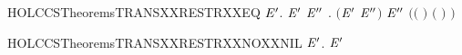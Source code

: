 \newcommand{\HOLCCSTheoremsTRANSXXRESTR}{\UseVerbatim{HOLCCSTheoremsTRANSXXRESTR}}
\begin{SaveVerbatim}{HOLCCSTheoremsTRANSXXRESTRXXEQ}
\HOLTokenTurnstile{} \HOLSymConst{\HOLTokenForall{}}   \ensuremath{\HOLBoundVar{E}\sp{\prime{}}}.
        \HOLTokenTransBegin{}\HOLTokenTransEnd \ensuremath{\HOLBoundVar{E}\sp{\prime{}}} \HOLSymConst{\HOLTokenEquiv{}}
     \HOLSymConst{\HOLTokenExists{}}\ensuremath{\HOLBoundVar{E}\sp{\prime{}\prime{}}} .
       \ensuremath{(}\ensuremath{\HOLBoundVar{E}\sp{\prime{}}} \HOLSymConst{\ensuremath{=}}   \ensuremath{\HOLBoundVar{E}\sp{\prime{}\prime{}}}\ensuremath{)} \HOLSymConst{\HOLTokenConj{}}  \HOLTokenTransBegin{}\HOLTokenTransEnd \ensuremath{\HOLBoundVar{E}\sp{\prime{}\prime{}}} \HOLSymConst{\HOLTokenConj{}}
       \ensuremath{(}\ensuremath{(} \HOLSymConst{\ensuremath{=}} \HOLConst{\ensuremath{\tau}}\ensuremath{)} \HOLSymConst{\HOLTokenDisj{}} \ensuremath{(} \HOLSymConst{\ensuremath{=}}  \ensuremath{)} \HOLSymConst{\HOLTokenConj{}}  \HOLConst{\HOLTokenNotIn{}}  \HOLSymConst{\HOLTokenConj{}}   \HOLConst{\HOLTokenNotIn{}} \ensuremath{)}
\end{SaveVerbatim}
\newcommand{\HOLCCSTheoremsTRANSXXRESTRXXEQ}{\UseVerbatim{HOLCCSTheoremsTRANSXXRESTRXXEQ}}
\begin{SaveVerbatim}{HOLCCSTheoremsTRANSXXRESTRXXNOXXNIL}
\HOLTokenTurnstile{} \HOLSymConst{\HOLTokenForall{}}   \ensuremath{\HOLBoundVar{E}\sp{\prime{}}}.    \HOLTokenTransBegin{}\HOLTokenTransEnd {}  \ensuremath{\HOLBoundVar{E}\sp{\prime{}}} \HOLSymConst{\HOLTokenImp{}}  \HOLSymConst{\HOLTokenNotEqual{}} 
\end{SaveVerbatim}
\newcommand{\HOLCCSTheoremsTRANSXXRESTRXXNOXXNIL}{\UseVerbatim{HOLCCSTheoremsTRANSXXRESTRXXNOXXNIL}}
